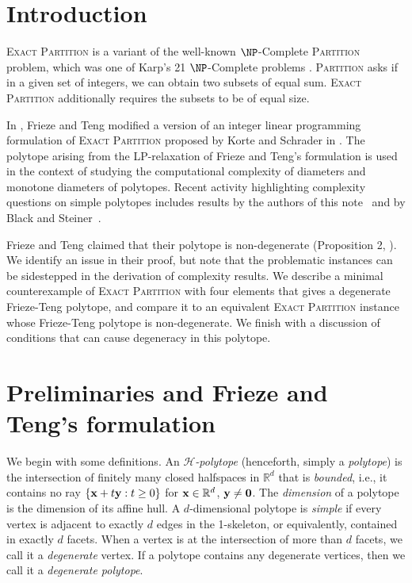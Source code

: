 \documentclass[3p, twocolumn]{elsarticle}
\def\ve#1{\mathchoice{\mbox{\boldmath$\displaystyle\bf#1$}}
{\mbox{\boldmath$\textstyle\bf#1$}}
{\mbox{\boldmath$\scriptstyle\bf#1$}}
{\mbox{\boldmath$\scriptscriptstyle\bf#1$}}}
\begin{document}


\section{Introduction}
\label{sec1}

\textsc{Exact Partition} is a variant of the well-known $\NP$-Complete \textsc{Partition} problem, which was one of Karp's 21 $\NP$-Complete problems \cite{Karp72}. \textsc{Partition} asks if in a given set of integers, we can obtain two subsets of equal sum. \textsc{Exact Partition} additionally requires the subsets to be of equal size. 

In \cite{FT94}, Frieze and Teng modified a version of an integer linear programming formulation of \textsc{Exact Partition} proposed by Korte and Schrader in \cite{KorteSchrader}. The polytope arising from the LP-relaxation of Frieze and Teng's formulation is used in the context of studying the computational complexity of diameters and monotone diameters of polytopes. 
Recent activity highlighting complexity questions on simple polytopes includes results by the authors of this note~\cite{NS26} and by Black and Steiner~\cite{black2026findingshortpathssimple}.


Frieze and Teng claimed that their polytope is non-degenerate (Proposition 2, \cite{FT94}). We identify an issue in their proof, but note that the problematic instances can be sidestepped in the derivation of complexity results.  
We describe a minimal counterexample of \textsc{Exact Partition} with four elements that gives a degenerate Frieze-Teng polytope, and compare it to an equivalent \textsc{Exact Partition} instance whose Frieze-Teng polytope is non-degenerate. We finish with a discussion of conditions that can cause degeneracy in this polytope. 
\vspace{-1em}

\section{Preliminaries and Frieze and Teng's formulation}
We begin with some definitions. An \textit{$\mathcal{H}$-polytope} (henceforth, simply a \textit{polytope}) is the intersection of finitely many closed halfspaces in $\mathbb{R}^d$ that is \textit{bounded}, i.e., it contains no ray $\{\ve{x}+t\ve{y}: t \geq 0\}$ for $\ve{x} \in \mathbb{R}^d$, $\ve{y} \neq \ve{0}$. The \textit{dimension} of a polytope is the dimension of its affine hull. A $d$-dimensional polytope is \textit{simple} if every vertex is adjacent to exactly $d$ edges in the 1-skeleton, or equivalently, contained in exactly $d$ facets. When a vertex is at the intersection of more than $d$ facets, we call it a \textit{degenerate} vertex.  If a polytope contains any degenerate vertices, then we call it a \textit{degenerate polytope}.
\end{document}
